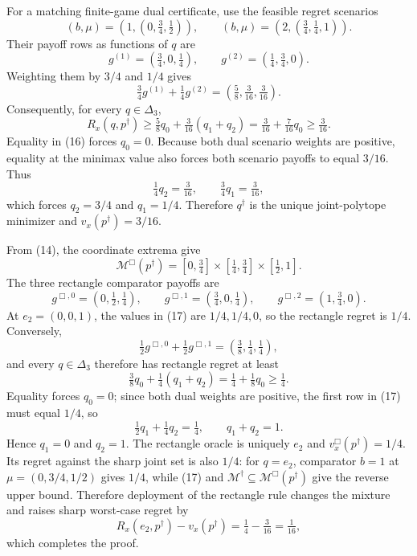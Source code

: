 For a matching finite-game dual certificate, use the feasible regret scenarios
\[
 (b,\mu)=\left(1,(0,\tfrac34,\tfrac12)\right),
 \qquad
 (b,\mu)=\left(2,(\tfrac34,\tfrac14,1)\right).
\]
Their payoff rows as functions of \(q\) are
\[
 g^{(1)}=(\tfrac34,0,\tfrac14),
 \qquad
 g^{(2)}=(\tfrac14,\tfrac34,0).
\]
Weighting them by \(3/4\) and \(1/4\) gives
\[
 \tfrac34g^{(1)}+\tfrac14g^{(2)}
 =\left(\tfrac58,\tfrac3{16},\tfrac3{16}\right).
\]
Consequently, for every \(q\in\Delta_3\),
\[
R_x(q,p^\dagger)
\geq\tfrac58q_0+\tfrac3{16}(q_1+q_2)
=\tfrac3{16}+\tfrac7{16}q_0
\geq\tfrac3{16}.
\tag{16}
\]
Equality in (16) forces \(q_0=0\).  Because both dual scenario weights are positive, equality at the minimax value also forces both scenario payoffs to equal \(3/16\).  Thus
\[
 \tfrac14q_2=\tfrac3{16},
 \qquad
 \tfrac34q_1=\tfrac3{16},
\]
which forces \(q_2=3/4\) and \(q_1=1/4\).  Therefore \(q^\dagger\) is the unique joint-polytope minimizer and \(v_x(p^\dagger)=3/16\).

From (14), the coordinate extrema give
\[
 \mathcal M^{\Box}(p^\dagger)
 =[0,\tfrac34]\times[\tfrac14,\tfrac34]\times[\tfrac12,1].
\]
The three rectangle comparator payoffs are
\[
 g^{\Box,0}=(0,\tfrac12,\tfrac14),\qquad
 g^{\Box,1}=(\tfrac34,0,\tfrac14),\qquad
 g^{\Box,2}=(1,\tfrac34,0).
\tag{17}
\]
At \(e_2=(0,0,1)\), the values in (17) are \(1/4,1/4,0\), so the rectangle regret is \(1/4\).  Conversely,
\[
 \tfrac12g^{\Box,0}+\tfrac12g^{\Box,1}
 =\left(\tfrac38,\tfrac14,\tfrac14\right),
\]
and every \(q\in\Delta_3\) therefore has rectangle regret at least
\[
 \tfrac38q_0+\tfrac14(q_1+q_2)
 =\tfrac14+\tfrac18q_0\geq\tfrac14.
\tag{18}
\]
Equality forces \(q_0=0\); since both dual weights are positive, the first row in (17) must equal \(1/4\), so
\[
 \tfrac12q_1+\tfrac14q_2=\tfrac14,
 \qquad q_1+q_2=1.
\]
Hence \(q_1=0\) and \(q_2=1\).  The rectangle oracle is uniquely \(e_2\) and \(v_x^{\Box}(p^\dagger)=1/4\).  Its regret against the sharp joint set is also \(1/4\): for \(q=e_2\), comparator \(b=1\) at \(\mu=(0,3/4,1/2)\) gives \(1/4\), while (17) and \(\mathcal M^\dagger\subseteq\mathcal M^{\Box}(p^\dagger)\) give the reverse upper bound.  Therefore deployment of the rectangle rule changes the mixture and raises sharp worst-case regret by
\[
 R_x(e_2,p^\dagger)-v_x(p^\dagger)
 =\tfrac14-\tfrac3{16}=\tfrac1{16},
\]
which completes the proof.
